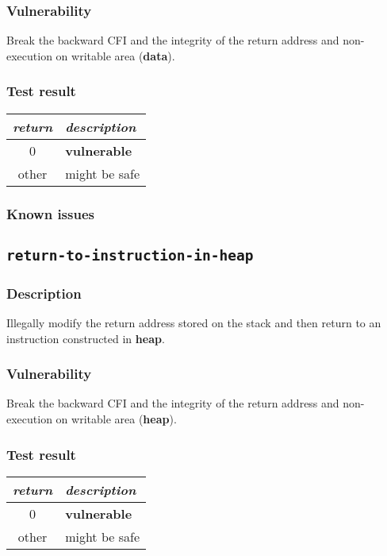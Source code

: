 \documentclass[a4paper]{book}
\begin{document}
\subsubsection{Vulnerability}
Break the backward CFI and the integrity of the return address and non-execution on writable area (\textbf{data}).

\subsubsection{Test result}
\begin{tabular}{cl}
  \toprule
  \emph{return}  & \emph{description} \\
  \midrule
  0              & \textbf{vulnerable} \\
  other          & might be safe \\
  \bottomrule
\end{tabular}
  
\subsubsection{Known issues}

\newpage
\subsection{\texttt{return-to-instruction-in-heap}}\label{test-return-to-instruction-in-heap}

\subsubsection{Description}
Illegally modify the return address stored on the stack and then return to  an instruction constructed in \textbf{heap}.

\subsubsection{Vulnerability}
Break the backward CFI and the integrity of the return address and non-execution on writable area (\textbf{heap}).

\subsubsection{Test result}
\begin{tabular}{cl}
  \toprule
  \emph{return}  & \emph{description} \\
  \midrule
  0              & \textbf{vulnerable} \\
  other          & might be safe \\
  \bottomrule
\end{tabular}
  
\end{document}
